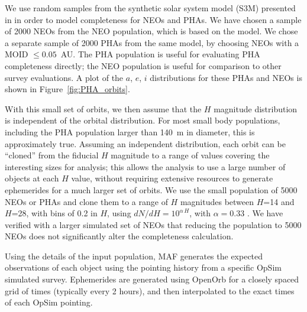 We use random samples from the synthetic solar system model (S3M) presented in \cite{Grav2011} in order to model completeness for NEOs and PHAs. We have chosen a sample of 2000 NEOs from the \cite{Grav2011} NEO population, which is based on the \cite{Bottke2002} model. We chose a separate sample of 2000 PHAs from the same model, by choosing NEOs with a MOID $\le 0.05$~AU. The PHA population is useful for evaluating PHA completeness directly; the NEO population is useful for comparison to other survey evaluations. A plot of the $a$, $e$, $i$ distributions for these PHAs and NEOs is shown in Figure~\ref{fig:PHA_orbits}.

With this small set of orbits, we then assume that the $H$ magnitude distribution is independent of the orbital distribution.
 For most small body populations, including the PHA population larger than 140~m in diameter, this is approximately true. 
 Assuming an independent distribution, each orbit can be ``cloned'' from the fiducial $H$ magnitude to a range of values 
 covering the interesting sizes for analysis; this allows the analysis to use a large number of objects at each $H$ value, without 
 requiring extensive resources to generate ephemerides for a much larger set of orbits. We use the small population of 
 5000 NEOs or PHAs and clone them to a range of $H$ magnitudes between $H$=14 and $H$=28, with bins of 0.2 in $H$,
 using $dN/dH = 10^{\alpha\, H}$, with $\alpha=0.33$ \citep{2017Icar..284..114S}. We have verified with a larger simulated set 
 of NEOs that reducing the population to 5000 NEOs does not significantly alter the completeness calculation.

Using the details of the input population, MAF generates the expected observations of each object using the pointing history
from a specific OpSim simulated survey. Ephemerides are generated using OpenOrb \citep{OpenOrb2009} for a closely spaced grid of times (typically every 2 hours), and then interpolated to the exact times of each OpSim pointing.


